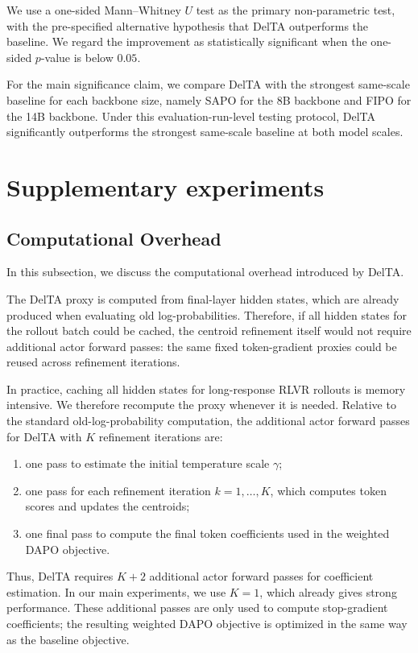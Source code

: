 \documentclass{article} %
\begin{document}
We use a one-sided Mann--Whitney \(U\) test as the primary non-parametric test, with the pre-specified alternative hypothesis that DelTA outperforms the baseline. We regard the improvement as statistically significant when the one-sided \(p\)-value is below \(0.05\).

For the main significance claim, we compare DelTA with the strongest same-scale baseline for each backbone size, namely SAPO for the 8B backbone and FIPO for the 14B backbone.
Under this evaluation-run-level testing protocol, DelTA significantly outperforms the strongest same-scale baseline at both model scales.

\section{Supplementary experiments}

\subsection{Computational Overhead}
\label{app:expense}

In this subsection, we discuss the computational overhead introduced by DelTA.

The DelTA proxy is computed from final-layer hidden states, which are already
produced when evaluating old log-probabilities. Therefore, if all hidden states
for the rollout batch could be cached, the centroid refinement itself would not
require additional actor forward passes: the same fixed token-gradient proxies
could be reused across refinement iterations.

In practice, caching all hidden states for long-response RLVR rollouts is memory
intensive. We therefore recompute the proxy whenever it is needed. Relative to
the standard old-log-probability computation, the additional actor forward passes
for DelTA with \(K\) refinement iterations are:

\begin{enumerate}
    \item one pass to estimate the initial temperature scale \(\gamma\);
    \item one pass for each refinement iteration \(k=1,\dots,K\), which computes
    token scores and updates the centroids;
    \item one final pass to compute the final token coefficients used in the
    weighted DAPO objective.
\end{enumerate}

Thus, DelTA requires \(K+2\) additional actor forward passes for coefficient
estimation. In our main experiments, we use \(K=1\), which already gives strong
performance. These additional passes are only used to compute stop-gradient
coefficients; the resulting weighted DAPO objective is optimized in the same way
as the baseline objective.
\end{document}
